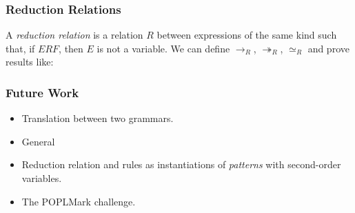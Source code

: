 \documentclass{beamer}
\begin{document}
\begin{frame}
\frametitle{Reduction Relations}
A \emph{reduction relation} is a relation $R$ between expressions of the same kind such that,
if $E R F$, then $E$ is not a variable.
We can define $\rightarrow_R$, $\twoheadrightarrow_R$, $\simeq_R$ and prove results like:
\end{frame}

\begin{frame}
\frametitle{Future Work}
\begin{itemize}
\item
Translation between two grammars.
\item
General 
\item
Reduction relation and rules as instantiations of \emph{patterns} with second-order variables.
\item
The POPLMark challenge.
\end{itemize}
\end{frame}
\end{document}
